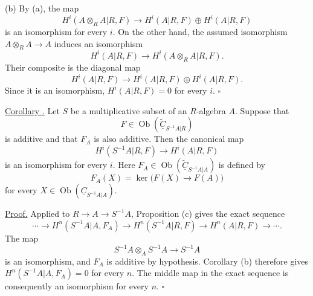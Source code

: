 (b) By (a), the map
\[
 H^i(A\otimes_RA|R,F)
 \longrightarrow H^i(A|R,F)\oplus H^i(A|R,F)
\]
is an isomorphism for every $i$. On the other hand, the assumed
isomorphism $A\otimes_RA\longrightarrow A$ induces an isomorphism
\[
 H^i(A|R,F)\longrightarrow H^i(A\otimes_RA|R,F).
\]
Their composite is the diagonal map
\[
 H^i(A|R,F)\longrightarrow
 H^i(A|R,F)\oplus H^i(A|R,F).
\]
Since it is an isomorphism, $H^i(A|R,F)=0$ for every $i$.
\hfill$\square$

\underline{Corollary .} Let $S$ be a multiplicative subset of
an $R$-algebra $A$. Suppose that
\[
 F\in\operatorname{Ob}
 (\widetilde{\underline C}_{S^{-1}A|R})
\]
is additive and that $F_A$ is also additive. Then the canonical map
\[
 H^i(S^{-1}A|R,F)\longrightarrow H^i(A|R,F)
\]
is an isomorphism for every $i$. Here
$F_A\in\operatorname{Ob}
(\widetilde{\underline C}_{S^{-1}A|A})$ is defined by
\[
 F_A(X)=\ker\bigl(F(X)\longrightarrow F(A)\bigr)
\]
for every
$X\in\operatorname{Ob}(\underline C_{S^{-1}A|A})$.

\underline{Proof.} Applied to
$R\longrightarrow A\longrightarrow S^{-1}A$, Proposition (c)
gives the exact sequence
\[
 \cdots\longrightarrow H^n(S^{-1}A|A,F_A)
 \longrightarrow H^n(S^{-1}A|R,F)
 \longrightarrow H^n(A|R,F)\longrightarrow\cdots.
\]
The map
\[
 S^{-1}A\otimes_AS^{-1}A\longrightarrow S^{-1}A
\]
is an isomorphism, and $F_A$ is additive by hypothesis. Corollary
(b) therefore gives
$H^n(S^{-1}A|A,F_A)=0$ for every $n$. The middle map in the exact
sequence is consequently an isomorphism for every $n$.
\hfill$\square$
